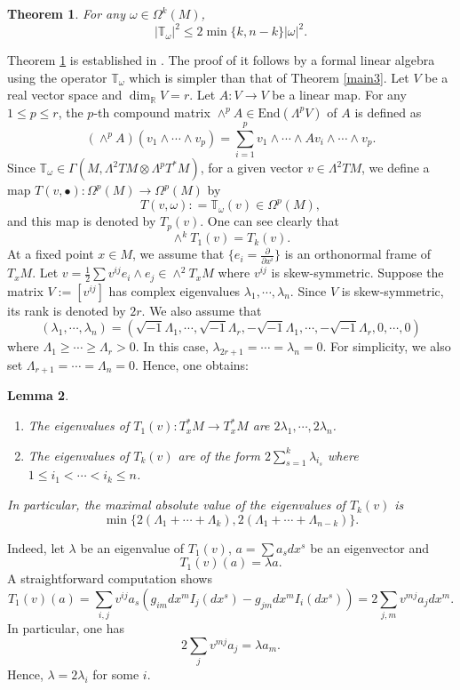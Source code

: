 \documentclass[12pt, reqno]{amsart}
\theoremstyle{plain}
\newtheorem{thm}{Theorem}[section]
\newtheorem{lemma}[thm]{Lemma}
\theoremstyle{definition}
\newcommand{\btheorem}{\begin{thm}}
\newcommand{\etheorem}{\end{thm}}
\newcommand{\elemma}{\end{lemma}}
\newcommand{\blemma}{\begin{lemma}}
\newcommand{\sq}{\sqrt{-1}}
\newcommand{\p}{\partial}
\newcommand{\beq}{\begin{equation}}
\newcommand{\eeq}{\end{equation}}
\newcommand{\bd}{\begin{enumerate}}
\newcommand{\ed}{\end{enumerate}}
\newcommand{\Om}{\Omega}
\renewcommand{\>}{\rightarrow}
\newcommand{\R}{{\mathbb R}}
\renewcommand{\#}{\sharp}
\numberwithin{equation}{section} %
\begin{document}
\btheorem \label{PWE}
For any $ \omega\in \Omega^k(M) $,
\beq  |\mathbb T_\omega|^2 \leq 2\min\{k,n-k\} |\omega|^2. \eeq
\etheorem
\noindent  Theorem \ref{PWE} is established in \cite{PetersenWink2021a}. The proof of it follows by a formal linear algebra using the operator $\mathbb T_\omega$ which is  simpler than that of Theorem \ref{main3}.  Let $V$ be a real vector
space and $\dim_\R V=r$. Let $A:V\>V$ be a linear map. For any $1\leq
p\leq r$, the $p$-th compound matrix  $\wedge^pA\in\mathrm{End}(\Lambda^pV)$ of $A$ is defined as \beq
\left(\wedge^pA\right)(v_1\wedge \cdots \wedge v_p)=\sum_{i=1}^p
v_1\wedge \cdots\wedge A v_i\wedge \cdots\wedge v_p.\eeq
Since  $ \mathbb T_\omega \in \Gamma\left(M,\Lambda^2TM\otimes \Lambda^{p}T^*M\right)$,
for a given vector $v\in \Lambda^2TM$,  we define a map $T( v, \bullet): \Om^p(M)\>\Om^p(M)$ by
\beq T(v,\omega): =\mathbb T_\omega (v)\in \Om^p(M),\eeq
and this map is denoted by $T_p(v)$. One can see clearly that
\beq  \wedge^k T_1(v)=T_k(v).\eeq
At a fixed point $x\in M$, we assume that $\{e_i=\frac{\p}{\p x^i}\}$ is an orthonormal frame of $T_xM$.  Let $v=\frac{1}{2}\sum v^{ij} e_i\wedge e_j\in\wedge^2 T_xM$ where $v^{ij}$ is skew-symmetric. Suppose the matrix $V:=\left[ v^{ij}\right]$ has complex eigenvalues $\lambda_1,\cdots, \lambda_n$. Since $V$ is skew-symmetric, its rank is denoted by $2r$. We also assume that \beq (\lambda_1,\cdots, \lambda_n)=\left(\sq \Lambda_1,\cdots, \sq \Lambda_r, -\sq \Lambda_1,\cdots, -\sq \Lambda_r,0,\cdots,0\right)\eeq
where  $\Lambda_1\geq \cdots \geq \Lambda_r>0$. In this case, $\lambda_{2r+1}=\cdots=\lambda_n=0$. For simplicity, we also set $\Lambda_{r+1}=\cdots=\Lambda_{n}=0$. Hence, one obtains:

\blemma\label{compoundeigenvalue}\bd \item  The eigenvalues of  $T_1(v):T^*_xM\>T_x^*M$ are $2\lambda_1,\cdots, 2\lambda_n$.
\item The eigenvalues of  $T_k(v)$ are of the form $2\sum\limits_{s=1}^k \lambda_{i_s}$ where $1\leq i_1<\cdots<i_k\leq n$.
\ed  In particular, the maximal absolute value  of the  eigenvalues of  $T_k(v)$ is \beq \min\{2\left(\Lambda_1+\cdots +\Lambda_k\right), 2\left(\Lambda_1+\cdots +\Lambda_{n-k}\right) \}.\eeq
\elemma
\noindent
Indeed, let $\lambda$ be an eigenvalue of $T_1(v)$, $a=\sum a_s dx^s$ be an eigenvector and  $$T_1(v)(a)=\lambda a.$$ A straightforward computation shows
\beq T_1(v)(a)=\sum_{i,j} v^{ij}a_s\left( g_{ im} dx^m I_j(dx^s) - g_{jm} dx^mI_i(dx^s) \right)=2\sum_{j,m} v^{mj}a_j dx^m.\eeq
In particular,  one has
\beq 2\sum_{j} v^{mj}a_j=\lambda a_m.\eeq
Hence,  $\lambda=2\lambda_i$ for some $i$.
\end{document}

